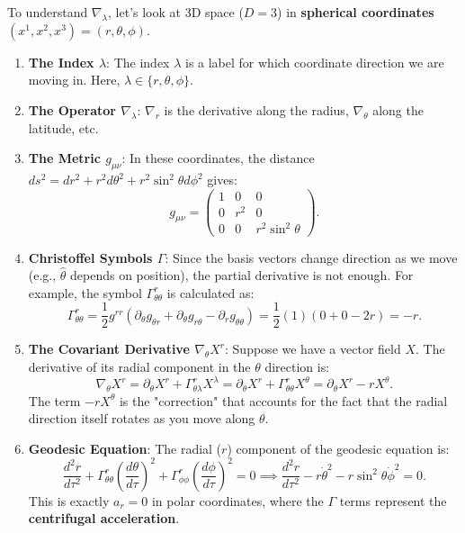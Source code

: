 \begin{solution}
\begin{remark}
To understand $\nabla_\lambda$, let's look at 3D space ($D=3$) in \textbf{spherical coordinates} $(x^1, x^2, x^3) = (r, \theta, \phi)$.
\begin{enumerate}
    \item \textbf{The Index $\lambda$}: The index $\lambda$ is a label for which coordinate direction we are moving in. Here, $\lambda \in \{r, \theta, \phi\}$.
    \item \textbf{The Operator $\nabla_\lambda$}: $\nabla_r$ is the derivative along the radius, $\nabla_\theta$ along the latitude, etc.
    \item \textbf{The Metric $g_{\mu\nu}$}: In these coordinates, the distance $ds^2 = dr^2 + r^2 d\theta^2 + r^2 \sin^2\theta d\phi^2$ gives:
    \[ g_{\mu\nu} = \begin{pmatrix} 1 & 0 & 0 \\ 0 & r^2 & 0 \\ 0 & 0 & r^2 \sin^2\theta \end{pmatrix}. \]
    \item \textbf{Christoffel Symbols $\Gamma$}: Since the basis vectors change direction as we move (e.g., $\hat{\theta}$ depends on position), the partial derivative is not enough. For example, the symbol $\Gamma^r_{\theta\theta}$ is calculated as:
    \[ \Gamma^r_{\theta\theta} = \frac{1}{2} g^{rr} (\partial_\theta g_{\theta r} + \partial_\theta g_{r \theta} - \partial_r g_{\theta\theta}) = \frac{1}{2} (1) (0 + 0 - 2r) = -r. \]
    \item \textbf{The Covariant Derivative $\nabla_\theta X^r$}: Suppose we have a vector field $X$. The derivative of its radial component in the $\theta$ direction is:
    \[ \nabla_\theta X^r = \partial_\theta X^r + \Gamma^r_{\theta\lambda} X^\lambda = \partial_\theta X^r + \Gamma^r_{\theta\theta} X^\theta = \partial_\theta X^r - r X^\theta. \]
    The term $-r X^\theta$ is the "correction" that accounts for the fact that the radial direction itself rotates as you move along $\theta$.
    \item \textbf{Geodesic Equation}: The radial ($r$) component of the geodesic equation is:
    \[ \frac{d^2 r}{d\tau^2} + \Gamma^r_{\theta\theta} \left(\frac{d\theta}{d\tau}\right)^2 + \Gamma^r_{\phi\phi} \left(\frac{d\phi}{d\tau}\right)^2 = 0 \implies \frac{d^2 r}{d\tau^2} - r \dot{\theta}^2 - r \sin^2\theta \dot{\phi}^2 = 0. \]
    This is exactly $a_r = 0$ in polar coordinates, where the $\Gamma$ terms represent the \textbf{centrifugal acceleration}.
\end{enumerate}
\end{remark}


\end{solution}
